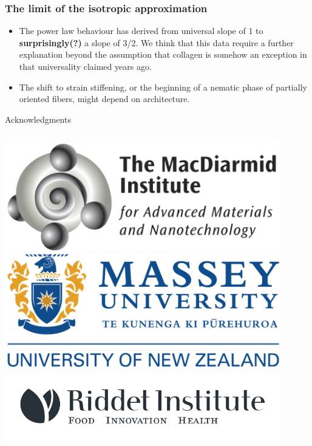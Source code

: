 \documentclass[9pt]{beamer}
\begin{document}
\begin{frame}
  \frametitle{The limit of the isotropic approximation}
  \begin{itemize}
    \item The power law behaviour has derived from universal slope of 1 \cite{mackintosh_bill} to \textbf{surprisingly(?)} a slope of  3/2. We think that this data require a further explanation beyond the assumption that collagen is somehow an exception in that universality claimed years ago.
    \item The shift to strain stiffening, or the beginning of a nematic phase of partially oriented fibers, might depend on architecture.
  \end{itemize}
\end{frame}

\begin{frame}{Acknowledgments}
  \vspace{0.3cm}
  \begin{columns}[onlytextwidth]
    \includegraphics[width=0.9\textwidth]{./Figures/people/macdiarmid.png}
    \includegraphics[width=0.9\textwidth]{./Figures/people/massey.png}
    \includegraphics[width=0.9\textwidth]{./Figures/people/riddet.png}

\end{columns}
\end{frame}
\end{document}
